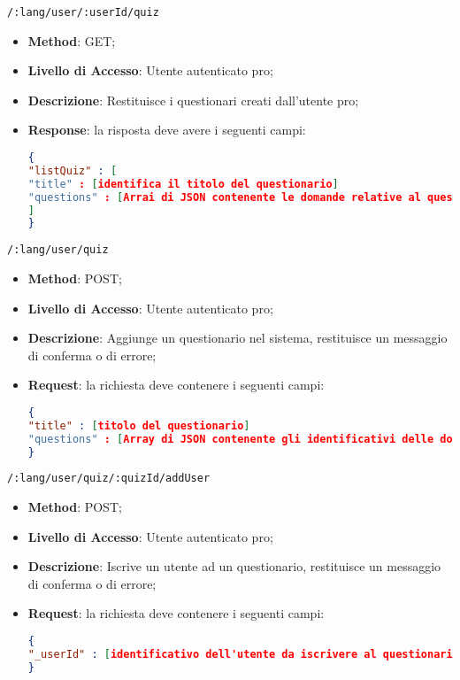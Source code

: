 \item \texttt{/:lang/user/:userId/quiz}
	\begin{itemize}
		\item \textbf{Method}: GET;
		\item \textbf{Livello di Accesso}: Utente autenticato pro;
		\item \textbf{Descrizione}: Restituisce i questionari creati dall'utente pro;
		\item \textbf{Response}: la risposta deve avere i seguenti campi:
\begin{lstlisting}[language=json,firstnumber=1]
{
"listQuiz" : [ 
"title" : [identifica il titolo del questionario]
"questions" : [Arrai di JSON contenente le domande relative al questionario]
]
}
\end{lstlisting}
	\end{itemize}	
	
	
	\item \texttt{/:lang/user/quiz}
		\begin{itemize}
			\item \textbf{Method}: POST;
			\item \textbf{Livello di Accesso}: Utente autenticato pro;
			\item \textbf{Descrizione}: Aggiunge un questionario nel sistema, restituisce un messaggio di conferma o di errore;
			\item \textbf{Request}: la richiesta deve contenere i seguenti campi:
\begin{lstlisting}[language=json,firstnumber=1]
{
"title" : [titolo del questionario]
"questions" : [Array di JSON contenente gli identificativi delle domande che compongono il questionario]
}
\end{lstlisting}
		\end{itemize}
		
		
	\item \texttt{/:lang/user/quiz/:quizId/addUser}
	\begin{itemize}
		\item \textbf{Method}: POST;
		\item \textbf{Livello di Accesso}: Utente autenticato pro;
		\item \textbf{Descrizione}: Iscrive un utente ad un questionario, restituisce un messaggio di conferma o di errore;
		\item \textbf{Request}: la richiesta deve contenere i seguenti campi:
\begin{lstlisting}[language=json,firstnumber=1]
{
"_userId" : [identificativo dell'utente da iscrivere al questionario]
}
\end{lstlisting}
	\end{itemize}
	
